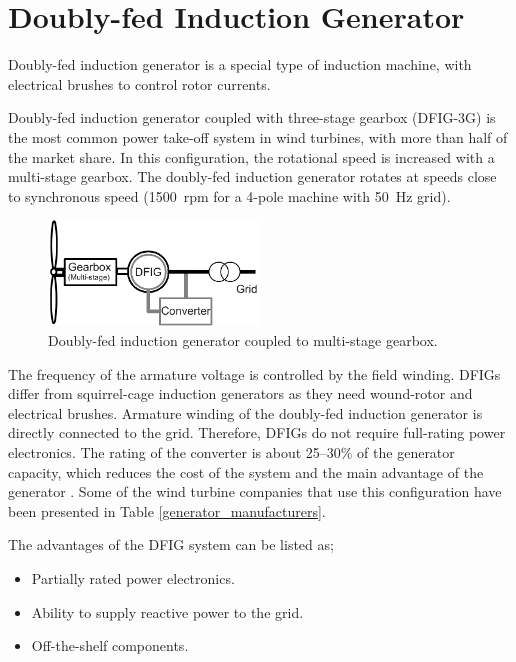 \documentclass[a4paper, 11pt]{article} %
\begin{document}
\section{Doubly-fed Induction Generator}

Doubly-fed induction generator is a special type of induction machine, with electrical brushes to control rotor currents. 

Doubly-fed induction generator coupled with three-stage gearbox (DFIG-3G) is the most common power take-off system in wind turbines, with more than half of the market share. In this configuration, the rotational speed is increased with a multi-stage gearbox. The doubly-fed induction generator rotates at speeds close to synchronous speed (1500~rpm for a 4-pole machine with 50~Hz grid).

  \begin{figure}
    \centering
    \includegraphics[width=0.5\textwidth]{DFIG_3G}
    \caption{Doubly-fed induction generator coupled to multi-stage gearbox.} 
    \label{dfig_3g}
  \end{figure}

The frequency of the armature voltage is controlled by the field winding. DFIGs differ from squirrel-cage induction generators as they need wound-rotor and electrical brushes. Armature winding of the doubly-fed induction generator is directly connected to the grid. Therefore, DFIGs do not require full-rating power electronics. The rating of the converter is about 25--30\% of the generator capacity, which reduces the cost of the system and the main advantage of the generator \cite{Li2008a} . Some of the wind turbine companies that use this configuration have been presented in Table \ref{generator_manufacturers}.

The advantages of the DFIG system can be listed as;

\begin{itemize}
	\item Partially rated power electronics.
	\item Ability to supply reactive power to the grid.
	\item Off-the-shelf components.
\end{itemize}
\end{document}
